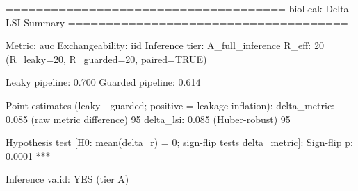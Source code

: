 \begin{CodeOutput}
=====================================
 bioLeak Delta LSI Summary
=====================================

Metric:            auc
Exchangeability:   iid
Inference tier:    A_full_inference
R_eff:             20  (R_leaky=20, R_guarded=20, paired=TRUE)

Leaky pipeline:    0.700
Guarded pipeline:  0.614

Point estimates (leaky - guarded; positive = leakage inflation):
  delta_metric:  0.085  (raw metric difference)
  95%
  delta_lsi:     0.085  (Huber-robust)
  95%

Hypothesis test  [H0: mean(delta_r) = 0; sign-flip tests delta_metric]:
  Sign-flip p:   0.0001 ***

Inference valid:   YES (tier A)
\end{CodeOutput}
